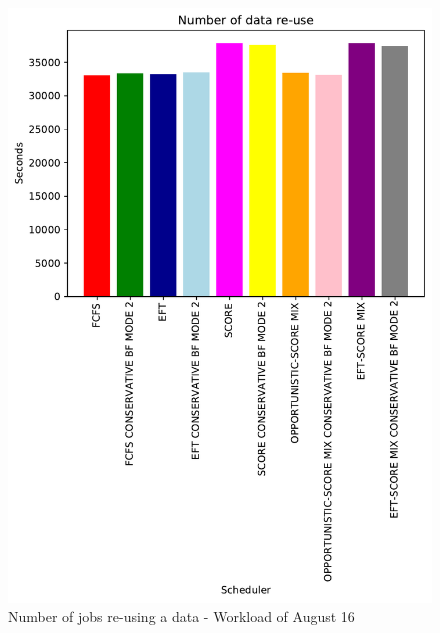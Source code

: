\documentclass[conference,10pt]{IEEEtran}
\begin{document}
\begin{figure}\centering\includegraphics[width=1\linewidth]{../MBSS/plot/Results_FCFS_Score_Backfill_2022-08-16->2022-08-16_V10000_Number_of_data_reuse_450_128_32_256_4_1024.pdf}\caption{Number of jobs re-using a data - Workload of August 16}\end{figure}
\end{document}

